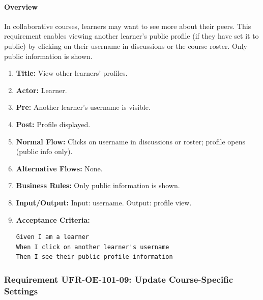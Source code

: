 \paragraph{Overview}
In collaborative courses, learners may want to see more about their peers. This requirement enables viewing another learner’s public profile (if they have set it to public) by clicking on their username in discussions or the course roster. Only public information is shown.
\begin{enumerate}[label=\textbf{\arabic*.}]
\item \textbf{Title:} View other learners' profiles.
\item \textbf{Actor:} Learner.
\item \textbf{Pre:} Another learner's username is visible.
\item \textbf{Post:} Profile displayed.
\item \textbf{Normal Flow:} Clicks on username in discussions or roster; profile opens (public info only).
\item \textbf{Alternative Flows:} None.
\item \textbf{Business Rules:} Only public information is shown.
\item \textbf{Input/Output:} Input: username. Output: profile view.
\item \textbf{Acceptance Criteria:}
    \begin{verbatim}
Given I am a learner
When I click on another learner's username
Then I see their public profile information
    \end{verbatim}
\end{enumerate}

\subsubsection{Requirement UFR-OE-101-09: Update Course-Specific Settings}
